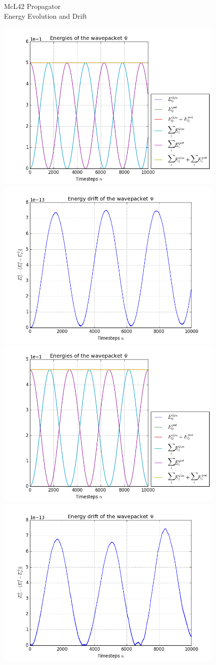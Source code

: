 \begin{figure}[ht]
	\centering
	\begin{minipage}[c]{\textwidth}
		\begin{center}
			\large McL42 Propagator \\[1mm]
			\normalsize Energy Evolution and Drift
			\vspace{4mm}
		\end{center}
	\end{minipage}
	\includegraphics[width=.45\textwidth]{figures/harmonic_1D_McL42_energies.png}
	\includegraphics[width=.45\textwidth]{figures/harmonic_1D_McL42_drift.png} \\
	\includegraphics[width=.45\textwidth]{figures/torsional_1D_McL42_energies.png}
	\includegraphics[width=.45\textwidth]{figures/torsional_1D_McL42_drift.png} \\

\end{figure}
